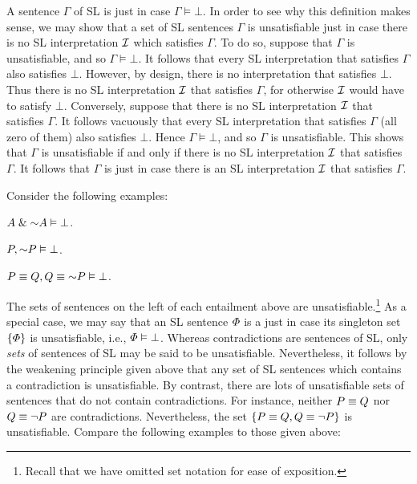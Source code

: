 A sentence $\Gamma$ of SL is  just in case $\Gamma \models \bot$.
In order to see why this definition makes sense, we may show that a set of SL sentences $\Gamma$ is unsatisfiable just in case there is no SL interpretation $\mathcal{I}$ which satisfies $\Gamma$.
To do so, suppose that $\Gamma$ is unsatisfiable, and so $\Gamma \models \bot$.
It follows that every SL interpretation that satisfies $\Gamma$ also satisfies $\bot$.
However, by design, there is no interpretation that satisfies $\bot$.
Thus there is no SL interpretation $\mathcal{I}$ that satisfies $\Gamma$, for otherwise $\mathcal{I}$ would have to satisfy $\bot$.
Conversely, suppose that there is no SL interpretation $\mathcal{I}$ that satisfies $\Gamma$.
It follows vacuously that every SL interpretation that satisfies $\Gamma$ (all zero of them) also satisfies $\bot$.
Hence $\Gamma \models \bot$, and so $\Gamma$ is unsatisfiable.
This shows that $\Gamma$ is unsatisfiable if and only if there is no SL interpretation $\mathcal{I}$ that satisfies $\Gamma$.
It follows that $\Gamma$ is  just in case there is an SL interpretation $\mathcal{I}$ that satisfies $\Gamma$.

Consider the following examples:

\begin{earg}
\item[] $A \eand \enot A \models \bot$.
\item[] $P, \enot P \models \bot$.
\item[] $P \eiff Q, Q \eiff\enot P \models \bot$.
\end{earg}

The sets of sentences on the left of each entailment above are unsatisfiable.\footnote{Recall that we have omitted set notation for ease of exposition.}
As a special case, we may say that an SL sentence $\varPhi$ is a  just in case its singleton set $\lbrace\varPhi\rbrace$ is unsatisfiable, i.e., $\varPhi \vDash \bot$.
Whereas contradictions are sentences of SL, only \textit{sets} of sentences of SL may be said to be unsatisfiable.
Nevertheless, it follows by the weakening principle given above that any set of SL sentences which contains a contradiction is unsatisfiable.
By contrast, there are lots of unsatisfiable sets of sentences that do not contain contradictions.
For instance, neither $P \equiv Q$ nor $Q \equiv \neg P$ are contradictions. 
Nevertheless, the set $\lbrace P \equiv Q, Q \equiv \neg P\rbrace$ is unsatisfiable. 
Compare the following examples to those given above:

